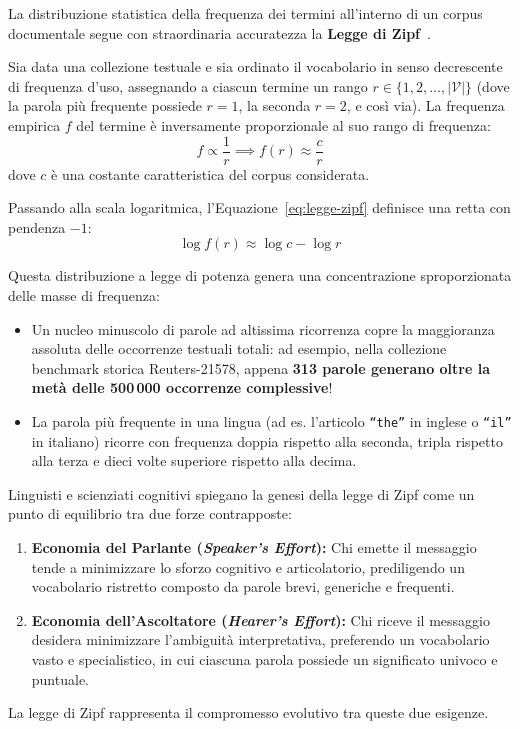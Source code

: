 La distribuzione statistica della frequenza dei termini all'interno di un corpus documentale segue con straordinaria accuratezza la \textbf{Legge di Zipf}~\cite{manning2008}.

\begin{definition}
Sia data una collezione testuale e sia ordinato il vocabolario in senso decrescente di frequenza d'uso, assegnando a ciascun termine un rango $r \in \{1, 2, \dots, |\mathcal{V}|\}$ (dove la parola pi\`u frequente possiede $r = 1$, la seconda $r = 2$, e cos\`i via). La frequenza empirica $f$ del termine \`e inversamente proporzionale al suo rango di frequenza:
\begin{equation}
f \propto \frac{1}{r} \implies f(r) \approx \frac{c}{r}
\label{eq:legge-zipf}
\end{equation}
dove $c$ \`e una costante caratteristica del corpus considerata.
\end{definition}

Passando alla scala logaritmica, l'Equazione~\eqref{eq:legge-zipf} definisce una retta con pendenza $-1$:
\begin{equation}
\log f(r) \approx \log c - \log r
\end{equation}

Questa distribuzione a legge di potenza genera una concentrazione sproporzionata delle masse di frequenza:
\begin{itemize}
    \item Un nucleo minuscolo di parole ad altissima ricorrenza copre la maggioranza assoluta delle occorrenze testuali totali: ad esempio, nella collezione benchmark storica Reuters-21578, appena \textbf{313 parole generano oltre la met\`a delle 500\,000 occorrenze complessive}!
    \item La parola pi\`u frequente in una lingua (ad es. l'articolo \texttt{``the''} in inglese o \texttt{``il''} in italiano) ricorre con frequenza doppia rispetto alla seconda, tripla rispetto alla terza e dieci volte superiore rispetto alla decima.
\end{itemize}

\begin{property}
Linguisti e scienziati cognitivi spiegano la genesi della legge di Zipf come un punto di equilibrio tra due forze contrapposte:
\begin{enumerate}
    \item \textbf{Economia del Parlante (\textit{Speaker's Effort}):} Chi emette il messaggio tende a minimizzare lo sforzo cognitivo e articolatorio, prediligendo un vocabolario ristretto composto da parole brevi, generiche e frequenti.
    \item \textbf{Economia dell'Ascoltatore (\textit{Hearer's Effort}):} Chi riceve il messaggio desidera minimizzare l'ambiguit\`a interpretativa, preferendo un vocabolario vasto e specialistico, in cui ciascuna parola possiede un significato univoco e puntuale.
\end{enumerate}
La legge di Zipf rappresenta il compromesso evolutivo tra queste due esigenze.
\end{property}

